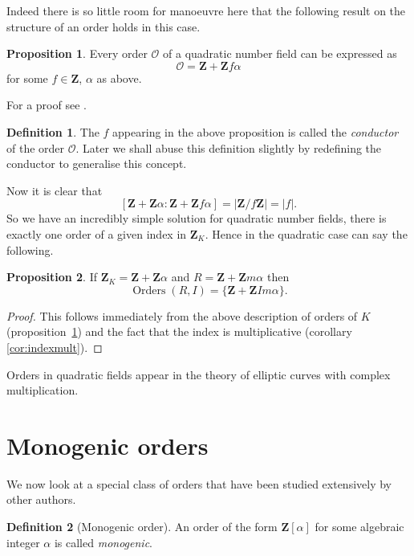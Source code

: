 \documentclass[a4paper,abstracton,bibtotoc]{scrreprt}
\theoremstyle{definition}
\newtheorem{prop}{Proposition}
\newtheorem{defn}{Definition}
\newcommand{\ZZ}{\mathbf{Z}}
\renewcommand{\O}{\mathcal{O}}
\DeclareMathOperator{\Orders}{Orders}
\begin{document}
Indeed there is so little room for manoeuvre here that the following result on the structure of an order holds in this case.

\begin{prop}
\label{prop:quadord}
Every order $\O$ of a quadratic number field can be expressed as
\[\O = \ZZ + \ZZ f\alpha\]
for some $f\in \ZZ$, $\alpha$ as above.
\end{prop}

For a proof see \cite[pp. 133--134]{cox}.

\begin{defn}
The $f$ appearing in the above proposition is called the \emph{conductor} of the order $\O$.
Later we shall abuse this definition slightly by redefining the conductor to generalise this concept.
\end{defn}

Now it is clear that
\[
[\ZZ + \ZZ\alpha : \ZZ + \ZZ f \alpha] = |\ZZ/f\ZZ| = |f|.
\]
So we have an incredibly simple solution for quadratic number fields, there is exactly one order of a given index in $\ZZ_K$.
Hence in the quadratic case can say the following.

\begin{prop}
If $\ZZ_K = \ZZ + \ZZ\alpha$ and $R = \ZZ + \ZZ m\alpha$ then
\[
\Orders(R, I) = \{\ZZ + \ZZ Im\alpha\}.
\]
\end{prop}
\begin{proof}
This follows immediately from the above description of orders of $K$ (proposition~\ref{prop:quadord}) and the fact that the index is multiplicative (corollary \ref{cor:indexmult}).
\end{proof}

Orders in quadratic fields appear in the theory of elliptic curves with complex multiplication. %


\section{Monogenic orders}

We now look at a special class of orders that have been studied extensively by other authors.

\begin{defn}[Monogenic order]
An order of the form $\ZZ[\alpha]$ for some algebraic integer $\alpha$ is called \emph{monogenic}.
\end{defn}
\end{document}
